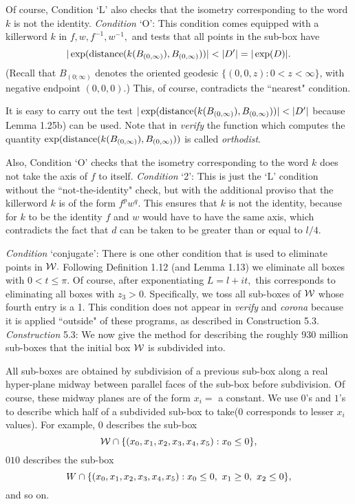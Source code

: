 Of course, Condition `L' also checks that the isometry corresponding to the word $k$ is not the identity.
{\it Condition}   `O':   This condition comes equipped with a killerword 
$k$ in $f, w, f^{-1}, w^{-1},$ and tests that all points in the sub-box have 
$$|\exp({\rm distance}(k(B_{(0,\infty)}),
B_{(0,\infty)}))| <  |D^{\prime}| = |\exp(D)|.$$    (Recall that 
$B_{(0;\infty)}$ denotes the oriented geodesic $\{(0,0,z): 0< z < \infty \}$,
with negative endpoint $(0,0,0).$)
This, of course, contradicts the ``nearest" condition.

It is easy to carry out the test $|\exp({\rm distance}(k(B_{(0,\infty)}), B_{(0,\infty)}))| <  |D^{\prime}|$ because
Lemma 1.25b) can be used. Note that in {\it verify} the function which computes the quantity
$\exp({\rm distance}(k(B_{(0,\infty)}), B_{(0,\infty)}))$ is called {\it orthodist}.  

Also, Condition `O' checks that the isometry corresponding to the word $k$ does not take the axis of $f$ to itself.
{\it Condition}   `2':  This is just the `L' condition without the ``not-the-identity" check, but with the additional
proviso that the killerword $k$ is of the form $f^p w^q.$ This ensures that $k$ is not the identity, because for $k$ to be
the identity $f$ and $w$ would have to have the same axis, which contradicts the fact that $d$ can be taken to be
greater than or equal to $l/4.$
\eject

{\it Condition}  `conjugate':  There is one other condition that is used to eliminate points in ${\cal W}.$  Following
Definition 1.12 (and Lemma 1.13) we eliminate all boxes with $0 < t \le \pi.$  Of course, after exponentiating $L = l+it,$
this corresponds to eliminating all boxes with $z_3 > 0.$ Specifically, we toss all sub-boxes of ${\cal W}$ whose fourth
entry is a 1. This condition does not appear in {\it verify} and {\it corona} because it is applied ``outside" of these
programs, as described in Construction 5.3.
 {\it Construction} 5.3: 
We now give the method for describing the roughly 930 million sub-boxes that the initial box ${\cal W}$ is subdivided into.

All sub-boxes are obtained by subdivision of a previous sub-box along a real
hyper-plane midway between parallel faces of the sub-box before
subdivision.  Of course, these midway planes are of the form $x_i = $ a
constant.   We use $0$'s and $1$'s to describe which half of a subdivided
sub-box to take\break ($0$ corresponds to lesser $x_i$ values).  For example, 0
describes 
the sub-box $${\cal W} \cap \{(x_0,x_1,x_2,x_3,x_4,x_5): x_0 \le 0 \},$$ 
$010$ describes the sub-box 
$$W \cap \{(x_0,x_1,x_2,x_3,\break x_4,x_5) : x_0 \le 0,\ x_1 \ge 0,\ x_2 \le 0 \},$$
and so on.

